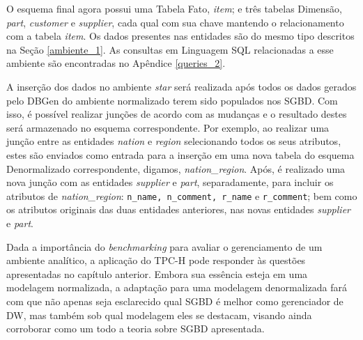 O esquema final agora possui uma Tabela Fato, \textit{item}; e três tabelas Dimensão, \textit{part}, \textit{customer} e \textit{supplier}, cada qual com sua chave mantendo o relacionamento com a tabela \textit{item}. Os dados presentes nas entidades são do mesmo tipo descritos na Seção \ref{ambiente_1}. As consultas em Linguagem SQL relacionadas a esse ambiente são encontradas no Apêndice \ref{queries_2}.

A inserção dos dados no ambiente \textit{star} será realizada após todos os dados gerados pelo DBGen do ambiente normalizado terem sido populados nos SGBD. Com isso, é possível realizar junções de acordo com as mudanças e o resultado destes será armazenado no esquema correspondente. Por exemplo, ao realizar uma junção entre as entidades \textit{nation} e \textit{region} selecionando todos os seus atributos, estes são enviados como entrada para a inserção em uma nova tabela do esquema Denormalizado correspondente, digamos, \textit{nation\_region}. Após, é realizado uma nova junção com as entidades \textit{supplier} e \textit{part}, separadamente, para incluir os atributos de \textit{nation\_region}: \texttt{n\_name, n\_comment, r\_name} e \texttt{r\_comment}; bem como os atributos originais das duas entidades anteriores, nas novas entidades \textit{supplier} e \textit{part}.

Dada a importância do \textit{benchmarking} para avaliar o gerenciamento de um ambiente analítico, a aplicação do TPC-H pode responder às questões apresentadas no capítulo anterior. Embora sua essência esteja em uma modelagem normalizada, a adaptação para uma modelagem denormalizada fará com que não apenas seja esclarecido qual SGBD é melhor como gerenciador de DW, mas também sob qual modelagem eles se destacam, visando ainda corroborar como um todo a teoria sobre SGBD apresentada.